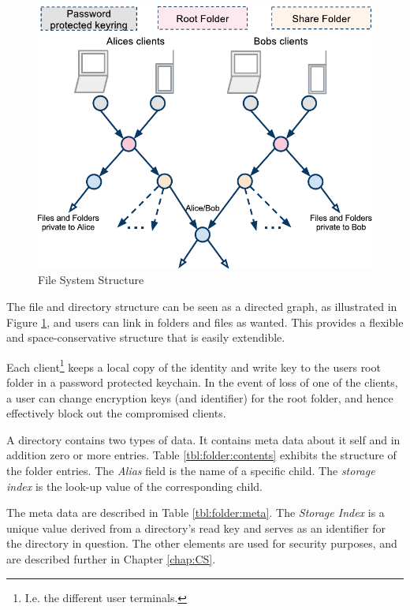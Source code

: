 \documentclass[pdftex,english,10pt,b5paper,twoside]{book}
\begin{document}
\begin{figure}[h!]
    \centering
    \includegraphics[width=\columnwidth]{ArchitectureFileSystem.pdf}
    \caption{File System Structure}
    \label{fig:AS:filesystem}
\end{figure}

The file and directory structure can be seen as a directed graph, as illustrated
in Figure \ref{fig:AS:filesystem}, and users can link in folders and files as
wanted. This provides a flexible and space-conservative structure that is easily
extendible.

Each client\footnote{I.e. the different user terminals.} keeps a local copy of
the identity and write key to the users root folder in a password
protected keychain. In the event of loss of one of the clients, a user can change
encryption keys (and identifier) for the root folder, and hence effectively
block out the compromised clients.



A directory contains two types of data. It contains meta data about it self and
in addition zero or more entries. Table \ref{tbl:folder:contents} exhibits the
structure of the folder entries. The \emph{Alias} field is the name of a
specific child. The \emph{storage index} is the look-up value of the
corresponding child.

The meta data are described in Table \ref{tbl:folder:meta}. The \emph{Storage
Index} is a unique value derived from a directory's read key and serves as an
identifier for the directory in question. The other elements are used for
security purposes, and are described further in Chapter \ref{chap:CS}.
\end{document}
